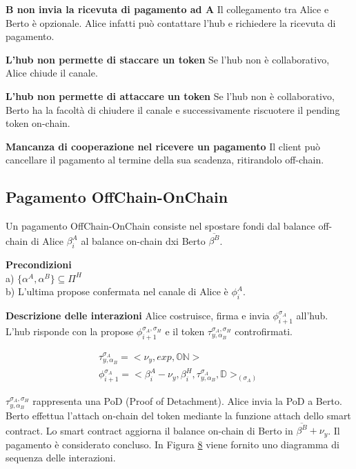 \documentclass[12pt,italian,]{book}
\begin{document}
\textbf{\textbf{B non invia la ricevuta di pagamento ad A}} Il collegamento tra Alice e Berto è opzionale. Alice infatti può contattare l'hub e richiedere la ricevuta di pagamento.

\textbf{\textbf{L'hub non permette di staccare un token}} Se l'hub non è collaborativo, Alice chiude il canale.

\textbf{\textbf{L'hub non permette di attaccare un token}} Se l'hub non è collaborativo, Berto ha la facoltà di chiudere il canale e successivamente riscuotere il pending token on-chain.

\textbf{\textbf{Mancanza di cooperazione nel ricevere un pagamento}} Il client può cancellare il pagamento al termine della sua scadenza, ritirandolo off-chain.

\hypertarget{pagamento-offchain-onchain}{%
\subsection{Pagamento OffChain-OnChain}\label{pagamento-offchain-onchain}}

Un pagamento OffChain-OnChain consiste nel spostare fondi dal balance off-chain di Alice \(\beta^A_i\) al balance on-chain dxi Berto \(\overline{\beta^B}\).

\textbf{\textbf{Precondizioni}}\\
a) \(\{\alpha^A, \alpha^B\} \subseteq \Pi^H\)\\
b) L'ultima propose confermata nel canale di Alice è \(\phi^A_i\).

\textbf{\textbf{Descrizione delle interazioni}} Alice costruisce, firma e invia \(\phi^{\sigma_A}_{i+1}\) all'hub. L'hub risponde con la propose \(\phi^{\sigma_A,\sigma_H}_{i+1}\) e il token \(\tau^{\sigma_A,\sigma_H}_{y, \alpha_B}\) controfirmati.

\begin{equation}
\begin{aligned}
\label{Propose detach pagamento OffChain-OnChain}
\tau^{\sigma_A}_{y, \alpha_B} =  <\nu_y, exp, \mathbb{ON}> \\
\phi^{\sigma_A}_{i+1} = <\beta^A_i-\nu_y, \beta^H_i, \tau^{\sigma_A}_{y, \alpha_B} ,\mathbb{D}>_(\sigma_A)
\end{aligned}
\end{equation}

\(\tau^{\sigma_A,\sigma_H}_{y, \alpha_B}\) rappresenta una PoD (Proof of Detachment). Alice invia la PoD a Berto. Berto effettua l'attach on-chain del token mediante la funzione attach dello smart contract. Lo smart contract aggiorna il balance on-chain di Berto in \(\overline{\beta^B}+\nu_y\). Il pagamento è considerato concluso. In Figura \protect\hyperlink{caso-duso-offchain-onchain}{8} viene fornito uno diagramma di sequenza delle interazioni.
\end{document}
